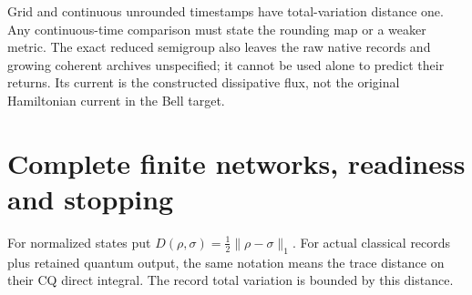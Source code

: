 \documentclass[11pt,oneside,openany]{book}
\theoremstyle{definition}
\theoremstyle{remark}\newtheorem{remark}[theorem]{Remark}
\begin{document}
Grid and continuous unrounded timestamps have total-variation distance
one. Any continuous-time comparison must state the rounding map or a
weaker metric. The exact reduced semigroup also leaves the raw native
records and growing coherent archives unspecified; it cannot be used
alone to predict their returns. Its current is the constructed
dissipative flux, not the original Hamiltonian current in the Bell
target.

\section{Complete finite networks, readiness and stopping}

For normalized states put $D(\rho,\sigma)=\tfrac12\|\rho-\sigma\|_1$.
For actual classical records plus retained quantum output, the same
notation means the trace distance on their CQ direct integral. The
record total variation is bounded by this distance.
\end{document}

